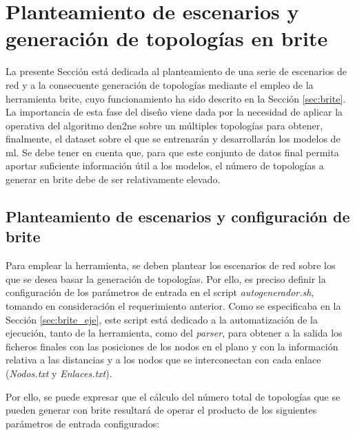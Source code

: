 \section{Planteamiento de escenarios y generación de topologías en \acrshort{brite}}
\label{sec:ejebrite}

La presente Sección está dedicada al planteamiento de una serie de escenarios de red y a la consecuente generación de topologías mediante el empleo de la herramienta \gls{brite}, cuyo funcionamiento ha sido descrito en la Sección \ref{sec:brite}. La importancia de esta fase del diseño viene dada por la necesidad de aplicar la operativa del algoritmo \gls{den2ne} sobre un múltiples topologías para obtener, finalmente, el dataset sobre el que se entrenarán y desarrollarán los modelos de \gls{ml}. Se debe tener en cuenta que, para que este conjunto de datos final permita aportar suficiente información útil a los modelos, el número de topologías a generar en \gls{brite} debe de ser relativamente elevado.

\vspace{3mm}

\subsection{Planteamiento de escenarios y configuración de \acrshort{brite}}
\label{sec:conftopo}

Para emplear la herramienta, se deben plantear los escenarios de red sobre los que se desea basar la generación de topologías. Por ello, es preciso definir la configuración de los parámetros de entrada en el script \textit{autogenerador.sh}, tomando en consideración el requerimiento anterior. Como se especificaba en la Sección \ref{sec:brite_eje}, este script está dedicado a la automatización de la ejecución, tanto de la herramienta, como del \textit{parser}, para obtener a la salida los ficheros finales con las posiciones de los nodos en el plano y con la información relativa a las distancias y a los nodos que se interconectan con cada enlace (\textit{Nodos.txt} y \textit{Enlaces.txt}). 

\vspace{3mm}

Por ello, se puede expresar que el cálculo del número total de topologías que se pueden generar con \gls{brite} resultará de operar el producto de los siguientes parámetros de entrada configurados:

